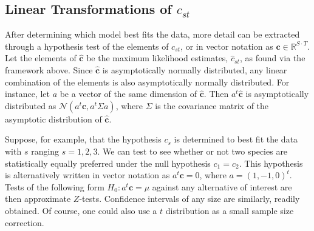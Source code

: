 \subsection{Linear Transformations of $c_{st}$}

After determining which model best fits the data, more detail can be extracted through a hypothesis test of the elements of $c_{st}$, or in vector notation as $\mathbf{c} \in \mathbb{R}^{S\cdot T}$.  Let the elements of $\hat{\mathbf{c}}$ be the maximum likelihood estimates, $\hat{c}_{st}$, as found via the framework above.  Since $\hat{\mathbf{c}}$ is asymptotically normally distributed, any linear combination of the elements is also asymptotically normally distributed.  For instance, let $a$ be a vector of the same dimension of $\hat{\mathbf{c}}$.  Then $a^t\hat{\mathbf{c}}$ is asymptotically distributed as $\mathcal{N}(a^t\mathbf{c}, a^t\Sigma a)$, where $\Sigma$ is the covariance matrix of the asymptotic distribution of $\hat{\mathbf{c}}$.  

Suppose, for example, that the hypothesis $c_s$ is determined to best fit the data with $s$ ranging $s = 1, 2, 3$.  We can test to see whether or not two species are statistically equally preferred under the null hypothesis $c_{1} = c_{2}$.  This hypothesis is alternatively written in vector notation as $a^t\mathbf{c} = 0$, where $a = (1, -1, 0)^t$.  Tests of the following form $H_0: a^t\mathbf{c} = \mu$ against any alternative of interest are then approximate $Z$-tests.  Confidence intervals of any size are similarly, readily obtained.  Of course, one could also use a $t$ distribution as a small sample size correction.

